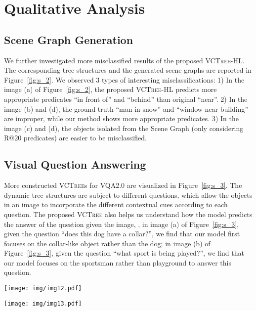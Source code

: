 \documentclass[10pt,twocolumn,letterpaper]{article}
\begin{document}
\section{Qualitative Analysis}
\subsection{Scene Graph Generation}
We further investigated more misclassified results of the proposed \textsc{VCTree}-HL. The corresponding tree structures and the generated scene graphs are reported in Figure~\ref{fig:s_2}. We observed 3 types of interesting misclassifications: 1) In the image (a) of Figure~\ref{fig:s_2}, the proposed \textsc{VCTree}-HL predicts more appropriate predicates ``in front of'' and ``behind'' than original ``near''. 2) In the image (b) and (d), the ground truth ``man in snow'' and ``window near building'' are improper, while our method shows more appropriate predicates. 3) In the image (c) and (d), the objects isolated from the Scene Graph (only considering R@20 predicates) are easier to be misclassified.

\subsection{Visual Question Answering}
More constructed \textsc{VCTree}s for VQA2.0 are visualized in Figure~\ref{fig:s_3}. The dynamic tree structures are subject to different questions, which allow the objects in an image to incorporate the different contextual cues according to each question. The proposed \textsc{VCTree} also helps us understand how the model predicts the answer of the question given the image, \eg, in image (a) of Figure~\ref{fig:s_3}, given the question ``does this dog have a collar?'', we find that our model first focuses on the collar-like object rather than the dog; in image (b) of Figure~\ref{fig:s_3}, given the question ``what sport is being played?'', we find that our model focuses on the sportsman rather than playground to answer this question.

\begin{figure*}
   \begin{minipage}[b]{1.0\linewidth}
   \centerline{\texttt{[image: img/img12.pdf]}}
   \end{minipage}
   \caption{The learned tree structures and generated scene graphs in VG. We selectively report the predicates from R@20 and all the ground-truth predicates. Black color indicates correctly detected objects or predicates; red indicates the misclassified ones; blue indicates correct predictions that not labeled as ground-truth.}
  \label{fig:s_2} \end{figure*}

\begin{figure*}
   \begin{minipage}[b]{1.0\linewidth}
   \centerline{\texttt{[image: img/img13.pdf]}}
   \end{minipage}
   \caption{The dynamic and interpretable tree structures that subject to different questions, which allow the objects in an image incorporate different contextual cues according to each question.}
  \label{fig:s_3} \end{figure*}
\end{document}
